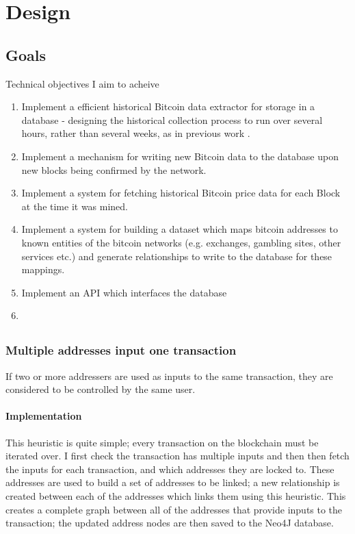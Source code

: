 \chapter{Design}

\section{Goals}
Technical objectives I aim to acheive
\begin{enumerate}
    \item Implement a efficient historical Bitcoin data extractor for storage in a database - designing the historical collection process to run over several hours, rather than several weeks, as in previous work \cite{RefWorks:doc:5c98e031e4b068320632cef2}.
    \item Implement a mechanism for writing new Bitcoin data to the database upon new blocks being confirmed by the network.
    \item Implement a system for fetching historical Bitcoin price data for each Block at the time it was mined.
    \item Implement a system for building a dataset which maps bitcoin addresses to known entities of the bitcoin networks (e.g. exchanges, gambling sites, other services etc.) and generate relationships to write to the database for these mappings.
    \item Implement an API which interfaces the database
    \item {}
\end{enumerate}
\section{}

\subsection{Multiple addresses input one transaction}
If two or more addressers are used as inputs to the same transaction, they are considered to be controlled by the same user. 
\subsubsection{Implementation}
This heuristic is quite simple; every transaction on the blockchain must be iterated over. I first check the transaction has multiple inputs and then then fetch the inputs for each transaction, and which addresses they are locked to. These addresses are used to build a set of addresses to be linked; a new relationship is created between each of the addresses which links them using this heuristic. This creates a complete graph between all of the addresses that provide inputs to the transaction; the updated address nodes are then saved to the Neo4J database. 

